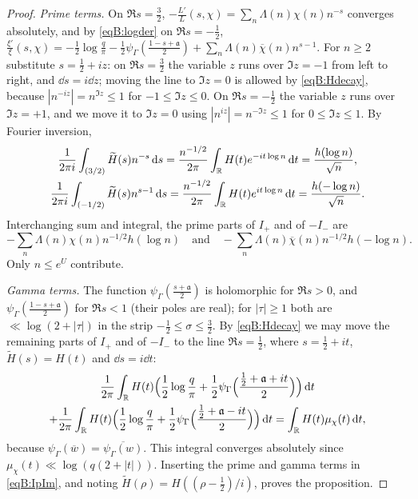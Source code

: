 \documentclass[11pt]{amsart}
\theoremstyle{definition}
\theoremstyle{remark}
\numberwithin{equation}{section}
\begin{document}
\begin{proof}
\emph{Prime terms.} On $\Re s=\frac32$, $-\frac{L'}L(s,\chi)=\sum_n\Lambda(n)\chi(n)n^{-s}$ converges absolutely, and by \eqref{eqB:logder} on $\Re s=-\frac12$, $\frac{\xi'}\xi(s,\chi)=-\frac12\log\frac q\pi-\frac12\psi_\Gamma(\frac{1-s+\mathfrak a}2)+\sum_n\Lambda(n)\overline\chi(n)n^{s-1}$. For $n\ge2$ substitute $s=\frac12+iz$: on $\Re s=\frac32$ the variable $z$ runs over $\Im z=-1$ from left to right, and $\dd s=i\dd z$; moving the line to $\Im z=0$ is allowed by \eqref{eqB:Hdecay}, because $|n^{-iz}|=n^{\Im z}\le1$ for $-1\le\Im z\le0$. On $\Re s=-\frac12$ the variable $z$ runs over $\Im z=+1$, and we move it to $\Im z=0$ using $|n^{iz}|=n^{-\Im z}\le1$ for $0\le\Im z\le1$. By Fourier inversion,
\begin{gather*}
\frac1{2\pi i}\int_{(3/2)}\widetilde H(s)n^{-s}\,\mathrm d s=\frac{n^{-1/2}}{2\pi}\int_\mathbb R H(t)e^{-it\log n}\,\mathrm d t=\frac{h(\log n)}{\sqrt n},\\
\frac1{2\pi i}\int_{(-1/2)}\widetilde H(s)n^{s-1}\,\mathrm d s=\frac{n^{-1/2}}{2\pi}\int_\mathbb R H(t)e^{it\log n}\,\mathrm d t=\frac{h(-\log n)}{\sqrt n}.
\end{gather*}
Interchanging sum and integral, the prime parts of $I_+$ and of $-I_-$ are
\[
-\sum_n\Lambda(n)\chi(n)n^{-1/2}h(\log n)\quad\text{and}\quad-\sum_n\Lambda(n)\overline\chi(n)n^{-1/2}h(-\log n).
\]
Only $n\le e^U$ contribute.

\emph{Gamma terms.} The function $\psi_\Gamma(\frac{s+\mathfrak a}2)$ is holomorphic for $\Re s>0$, and $\psi_\Gamma(\frac{1-s+\mathfrak a}2)$ for $\Re s<1$ (their poles are real); for $|\tau|\ge1$ both are $\ll\log(2+|\tau|)$ in the strip $-\frac12\le\sigma\le\frac32$. By \eqref{eqB:Hdecay} we may move the remaining parts of $I_+$ and of $-I_-$ to the line $\Re s=\frac12$, where $s=\frac12+it$, $\widetilde H(s)=H(t)$ and $\dd s=i\dd t$:
\begin{multline*}
\frac1{2\pi}\int_\mathbb R H(t)\Big(\frac12\log\frac q\pi+\frac12\psi_\Gamma\Big(\frac{\frac12+\mathfrak a+it}2\Big)\Big)\,\mathrm d t\\
+\frac1{2\pi}\int_\mathbb R H(t)\Big(\frac12\log\frac q\pi+\frac12\psi_\Gamma\Big(\frac{\frac12+\mathfrak a-it}2\Big)\Big)\,\mathrm d t=\int_\mathbb R H(t)\mu_\chi(t)\,\mathrm d t,
\end{multline*}
because $\psi_\Gamma(\overline w)=\overline{\psi_\Gamma(w)}$. This integral converges absolutely since $\mu_\chi(t)\ll\log(q(2+|t|))$. Inserting the prime and gamma terms in \eqref{eqB:IpIm}, and noting $\widetilde H(\rho)=H((\rho-\frac12)/i)$, proves the proposition.
\end{proof}
\end{document}
